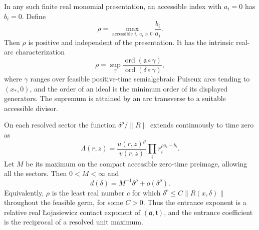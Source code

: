 \begin{theorem}\label{thm:v101-divisorial}
In any such finite real monomial presentation, an accessible index
with $a_i=0$ has $b_i=0$. Define
\begin{equation}\label{eq:v101-rho}
 \rho=\max_{\text{accessible }i,\ a_i>0}\frac{b_i}{a_i}.
\end{equation}
Then $\rho$ is positive and independent of the presentation. It has
the intrinsic real-arc characterization
\begin{equation}\label{eq:v101-arc-contact}
 \rho=\sup_{\gamma}
 \frac{\operatorname{ord}(\mathfrak a\circ\gamma)}
      {\operatorname{ord}(\delta\circ\gamma)},
\end{equation}
where $\gamma$ ranges over feasible positive-time semialgebraic Puiseux
arcs tending to $(x_*,0)$, and the order of an ideal is the minimum
order of its displayed generators. The supremum is attained by an arc
transverse to a suitable accessible divisor.

On each resolved sector the function $\delta^\rho/\|R\|$ extends
continuously to time zero as
\begin{equation}\label{eq:v101-unit-ratio}
 \Lambda(r,z)=\frac{u(r,z)^\rho}{v(r,z)}
                 \prod_i r_i^{\rho a_i-b_i}.
\end{equation}
Let $M$ be its maximum on the compact accessible zero-time preimage,
allowing all the sectors. Then $0<M<\infty$ and
\begin{equation}\label{eq:v101-unit-constant}
 d(\delta)=M^{-1}\delta^\rho+o(\delta^\rho).
\end{equation}
Equivalently, $\rho$ is the least real number $c$ for which
$\delta^c\le C\|R(x,\delta)\|$ throughout the feasible germ, for
some $C>0$. Thus the entrance exponent is a relative real
\L{}ojasiewicz contact exponent of $(\mathfrak a,\mathfrak t)$,
and the entrance coefficient is the reciprocal of a resolved unit maximum.
\end{theorem}

